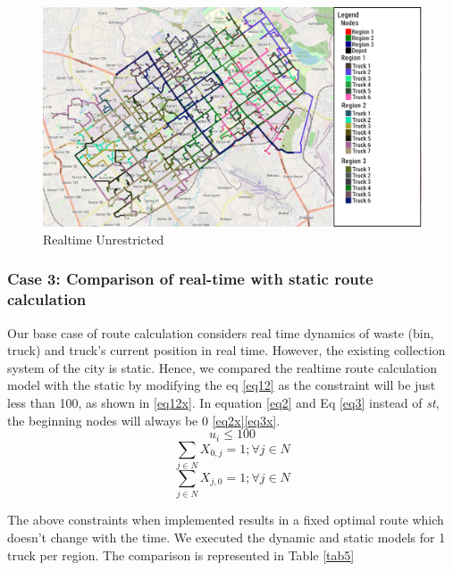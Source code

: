 \documentclass[12pt]{article}
\begin{document}
 

\begin{figure}[H]
    \centering
    \includegraphics[scale=0.4]{Dynamic_weighted_unrestricted.png} %
    \caption{Realtime Unrestricted}\label{fig2}
\end{figure}


\subsubsection*{Case 3: Comparison of real-time with static route calculation}

Our base case of route calculation considers real time dynamics of waste (bin, truck) and truck's current position in real time. However, the existing collection system of the city is static. Hence, we compared the realtime route calculation model with the static by modifying the eq \eqref{eq12} as the constraint will be just less than 100, as shown in \eqref{eq12x}. In equation \eqref{eq2} and Eq \eqref{eq3} instead of \textit{st}, the beginning nodes will always be 0 \eqref{eq2x}\eqref{eq3x}. 
\begin{equation}\label{eq12x}
    u_i\le 100
\end{equation}
\begin{equation}\label{eq2x}
    \sum_{j\in N}X_{0,j}=1 ; \forall j \in N
\end{equation}
\begin{equation}\label{eq3x}
    \sum_{j\in N}X_{j,0}=1 ; \forall j \in N
\end{equation}

The above constraints when implemented results in a fixed optimal route which doesn't change with the time. We executed the dynamic and static models for 1 truck per region. The comparison is represented in Table \ref{tab5}
\end{document}
